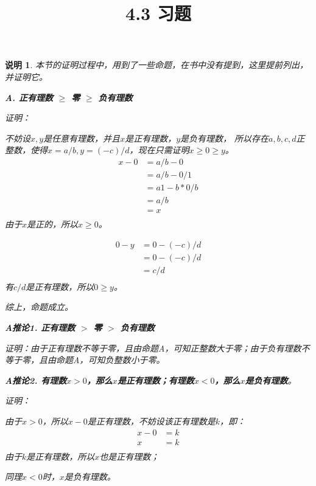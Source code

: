 \documentclass{article}
\theoremstyle{mystyle}
\newtheorem*{zremark}{说明}
\begin{document}
\title{4.3 习题}
\maketitle

\begin{zgraytheorem}
  \begin{zremark}
    本节的证明过程中，用到了一些命题，在书中没有提到，这里提前列出，并证明它。

    \textbf{A. 正有理数 $\geq$ 零 $\geq$ 负有理数}

    证明：

    不妨设$x,y$是任意有理数，并且$x$是正有理数，$y$是负有理数，
    所以存在$a,b,c,d$正整数，使得$x=a/b,y=(-c)/d$，现在只需证明$x \geq 0 \geq y$。
    \begin{align*}
      x - 0 & = a/b - 0   \\
            & = a/b - 0/1 \\
            & = a1-b*0/b  \\
            & = a / b     \\
            & = x         \\
    \end{align*}
    由于$x$是正的，所以$x \geq 0$。

    \begin{align*}
      0 - y & = 0 - (-c)/d \\
            & = 0 - (-c)/d \\
            & = c/d        \\
    \end{align*}
    有$c/d$是正有理数，所以$0 \geq y$。

    综上，命题成立。

    \textbf{A推论1. 正有理数 $>$ 零 $>$ 负有理数}

    证明：由于正有理数不等于零，且由命题A，可知正整数大于零；由于负有理数不等于零，且由命题A，可知负整数小于零。

    \textbf{A推论2. 有理数$x>0$，那么$x$是正有理数；有理数$x < 0$，那么$x$是负有理数}。

    证明：

    由于$x>0$，所以$x-0$是正有理数，不妨设该正有理数是$k$，即：
    \begin{align*}
      x-0 & = k \\
      x   & = k \\
    \end{align*}
    由于$k$是正有理数，所以$x$也是正有理数；

    同理$x < 0$时，$x$是负有理数。



\end{zremark}
\end{zgraytheorem}
\end{document}
